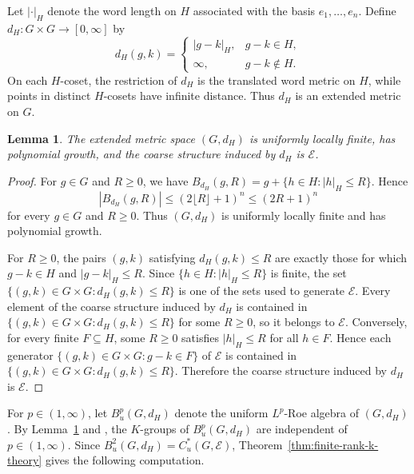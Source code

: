 \documentclass[pdflatex,sn-mathphys-num]{sn-jnl}%
\theoremstyle{plain}
\newtheorem{lemma}[theorem]{Lemma}
\theoremstyle{remark}
\theoremstyle{definition}
\numberwithin{equation}{section}
\begin{document}
Let \( |\cdot|_H \) denote the word length on \( H \) associated with the basis \( e_1,\ldots,e_n \). Define \( d_H\colon G\times G\to[0,\infty] \) by
\[
d_H(g,k)=
\begin{cases}
|g-k|_H, & g-k\in H,\\
\infty, & g-k\notin H.
\end{cases}
\]
On each \( H \)-coset, the restriction of \( d_H \) is the translated word metric on \( H \), while points in distinct \( H \)-cosets have infinite distance. Thus \( d_H \) is an extended metric on \( G \).

\begin{lemma}
\label{lem:lp-extended-metric}
The extended metric space \( (G,d_H) \) is uniformly locally finite, has polynomial growth, and the coarse structure induced by \( d_H \) is \( \mathcal E \).
\end{lemma}

\begin{proof}
For \( g\in G \) and \( R\geq0 \), we have 
\( B_{d_H}(g,R)=g+\{h\in H:|h|_H\leq R\} \). Hence 
\[ 
|B_{d_H}(g,R)|
\leq
(2\lfloor R\rfloor+1)^n
\leq
(2R+1)^n 
\] 
for every \( g\in G \) and \( R\geq0 \). Thus \( (G,d_H) \) is uniformly locally finite and has polynomial growth.

For \( R\geq0 \), the pairs \( (g,k) \) satisfying \( d_H(g,k)\leq R \) are exactly those for which \( g-k\in H \) and \( |g-k|_H\leq R \). Since \( \{h\in H:|h|_H\leq R\} \) is finite, the set \( \{(g,k)\in G\times G:d_H(g,k)\leq R\} \) is one of the sets used to generate \( \mathcal E \). Every element of the coarse structure induced by \( d_H \) is contained in \( \{(g,k)\in G\times G:d_H(g,k)\leq R\} \) for some \( R\geq0 \), so it belongs to \( \mathcal E \). Conversely, for every finite \( F\subseteq H \), some \( R\geq0 \) satisfies \( |h|_H\leq R \) for all \( h\in F \). Hence each generator \( \{(g,k)\in G\times G:g-k\in F\} \) of \( \mathcal E \) is contained in \( \{(g,k)\in G\times G:d_H(g,k)\leq R\} \). Therefore the coarse structure induced by \( d_H \) is \( \mathcal E \).
\end{proof}

For \( p\in(1,\infty) \), let \( B_u^p(G,d_H) \) denote the uniform \( L^p \)-Roe algebra of \( (G,d_H) \). By Lemma~\ref{lem:lp-extended-metric} and \cite[Corollary~5.9]{austad2025polynomial}, the \( K \)-groups of \( B_u^p(G,d_H) \) are independent of \( p\in(1,\infty) \). Since \( B_u^2(G,d_H)=C_u^*(G,\mathcal E) \), Theorem~\ref{thm:finite-rank-k-theory} gives the following computation.
\end{document}
